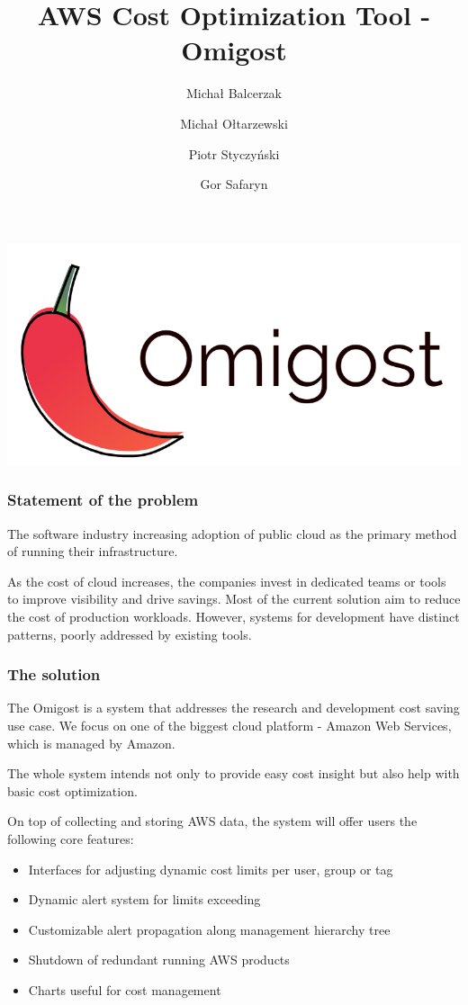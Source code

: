 \documentclass[licencjacka,en]{thesisclass}
\author{
  Michał Balcerzak
  \and
  Michał Ołtarzewski
  \and
  Piotr Styczyński
  \and
  Gor Safaryn
}
\title{AWS Cost Optimization Tool - Omigost}
\begin{document}
\includegraphics[width=\textwidth*\real{0.6}]{imgs/logo.png}

\subsubsection{Statement of the problem}

The software industry increasing adoption of public cloud as the primary method of running their infrastructure.

As the cost of cloud increases, the companies invest in dedicated teams or tools to improve visibility and drive savings. Most of the current solution aim to reduce the cost of production workloads. However, systems for development have distinct patterns, poorly addressed by existing tools. 

\subsubsection{The solution}

The Omigost is a system that addresses the research and development cost saving use case. We focus on one of the biggest cloud platform - Amazon Web Services, which is managed by Amazon.

The whole system intends not only to provide easy cost insight but also help with basic cost optimization.

On top of collecting and storing AWS data, the system will offer users the following core features:

\begin{itemize}
  \item Interfaces for adjusting dynamic cost limits per user, group or tag
  \item Dynamic alert system for limits exceeding
  \item Customizable alert propagation along management hierarchy tree
  \item Shutdown of redundant running AWS products
  \item Charts useful for cost management
\end{itemize}
\end{document}
